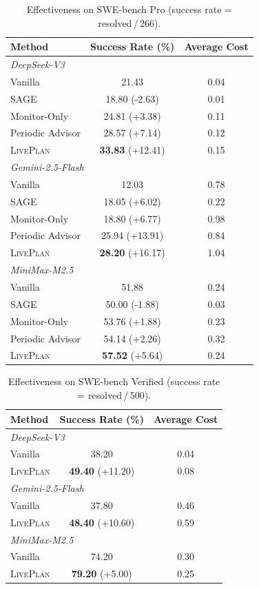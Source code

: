 \begin{table}[t]
\centering
\caption{Effectiveness on SWE-bench Pro (success rate = resolved\,/\,266).}
\begin{tabular}{lcc}
\toprule
Method & Success Rate (\%) & Average Cost \\
\midrule
\multicolumn{3}{l}{\textit{DeepSeek-V3}} \\
Vanilla & 21.43 & 0.04 \\
SAGE & 18.80 {\scriptsize(-2.63)} & 0.01 \\
Monitor-Only & 24.81 {\scriptsize(+3.38)} & 0.11 \\
Periodic Advisor & 28.57 {\scriptsize(+7.14)} & 0.12 \\
\textsc{LivePlan} & \textbf{33.83} {\scriptsize(+12.41)} & 0.15 \\
\midrule
\multicolumn{3}{l}{\textit{Gemini-2.5-Flash}} \\
Vanilla & 12.03 & 0.78 \\
SAGE & 18.05 {\scriptsize(+6.02)} & 0.22 \\
Monitor-Only & 18.80 {\scriptsize(+6.77)} & 0.98 \\
Periodic Advisor & 25.94 {\scriptsize(+13.91)} & 0.84 \\
\textsc{LivePlan} & \textbf{28.20} {\scriptsize(+16.17)} & 1.04 \\
\midrule
\multicolumn{3}{l}{\textit{MiniMax-M2.5}} \\
Vanilla & 51.88 & 0.24 \\
SAGE & 50.00 {\scriptsize(-1.88)} & 0.03 \\
Monitor-Only & 53.76 {\scriptsize(+1.88)} & 0.23 \\
Periodic Advisor & 54.14 {\scriptsize(+2.26)} & 0.32 \\
\textsc{LivePlan} & \textbf{57.52} {\scriptsize(+5.64)} & 0.24 \\
\bottomrule
\end{tabular}
\end{table}

\begin{table}[t]
\centering
\caption{Effectiveness on SWE-bench Verified (success rate = resolved\,/\,500).}
\begin{tabular}{lcc}
\toprule
Method & Success Rate (\%) & Average Cost \\
\midrule
\multicolumn{3}{l}{\textit{DeepSeek-V3}} \\
Vanilla & 38.20 & 0.04 \\
\textsc{LivePlan} & \textbf{49.40} {\scriptsize(+11.20)} & 0.08 \\
\midrule
\multicolumn{3}{l}{\textit{Gemini-2.5-Flash}} \\
Vanilla & 37.80 & 0.46 \\
\textsc{LivePlan} & \textbf{48.40} {\scriptsize(+10.60)} & 0.59 \\
\midrule
\multicolumn{3}{l}{\textit{MiniMax-M2.5}} \\
Vanilla & 74.20 & 0.30 \\
\textsc{LivePlan} & \textbf{79.20} {\scriptsize(+5.00)} & 0.25 \\
\bottomrule
\end{tabular}
\end{table}
